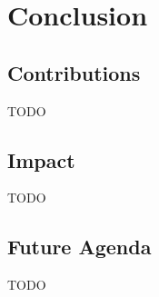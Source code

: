 \section{Conclusion}
\label{sec:conclusion}

\subsection{Contributions}

TODO


\subsection{Impact}

TODO


\subsection{Future Agenda}

TODO


